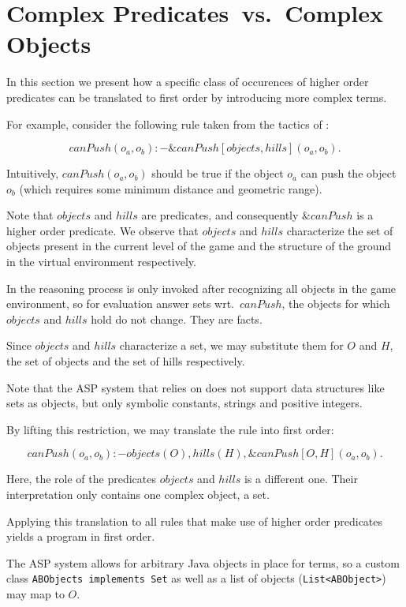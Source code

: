 \section{Complex Predicates~vs.~Complex Objects}
\label{sec:main}

In this section we present how a specific class of occurences of higher order predicates can be translated to first order by introducing more complex terms.

For example, consider the following rule taken from the tactics of \ah:


$$ canPush(o_a,o_b) :- \&canPush[objects,hills](o_a,o_b). $$

Intuitively, $canPush(o_a, o_b)$ should be true if the object $o_a$ can push the object $o_b$ (which requires some minimum distance and geometric range).

Note that $objects$ and $hills$ are predicates, and consequently $\&canPush$ is a higher order predicate. We observe that $objects$ and $hills$ characterize the set of objects present in the current level of the game and the structure of the ground in the virtual environment respectively.

In \ah the reasoning process is only invoked after recognizing all objects in the game environment, so for evaluation answer sets wrt.~$canPush$, the objects for which $objects$ and $hills$ hold do not change. They are facts.

Since $objects$ and $hills$ characterize a set, we may substitute them for $O$ and $H$, the set of objects and the set of hills respectively.

Note that the ASP system that \ah relies on does not support data structures like sets as objects, but only symbolic constants, strings and positive integers.

By lifting this restriction, we may translate the rule into first order:

$$ canPush(o_a,o_b) :- objects(O), hills(H), \&canPush[O,H](o_a,o_b). $$

Here, the role of the predicates $objects$ and $hills$ is a different one. Their interpretation only contains one complex object, a set.

Applying this translation to all rules that make use of higher order predicates yields a program in first order.

The ASP system \al allows for arbitrary Java objects in place for terms, so a custom class \texttt{ABObjects implements Set} as well as a list of objects (\texttt{List<ABObject>}) may map to $O$.


